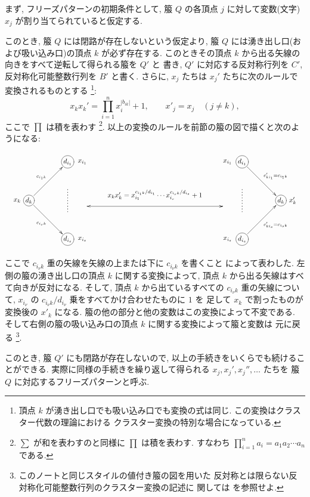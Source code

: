 \documentclass[12pt,twoside,dvipdfm]{jarticle}
\theoremstyle{definition} %
\theoremstyle{definition} %
\theoremstyle{definition} %
\numberwithin{theorem}{section}
\numberwithin{equation}{section}
\numberwithin{figure}{section}
\numberwithin{table}{section}
\begin{document}
まず, フリーズパターンの初期条件として,
箙 $Q$ の各頂点 $j$ に対して変数(文字) $x_j$ が割り当てられていると仮定する.

このとき, 箙 $Q$ には閉路が存在しないという仮定より, 
箙 $Q$ には湧き出し口(および吸い込み口)の頂点 $k$ が必ず存在する.
このときその頂点 $k$ から出る矢線の向きをすべて逆転して得られる箙を $Q'$ と
書き, $Q'$ に対応する反対称行列を $C'$, 反対称化可能整数行列を $B'$ と書く.
さらに, $x_j$ たちは $x_j'$ たちに次のルールで変換されるものとする%
\footnote{頂点 $k$ が湧き出し口でも吸い込み口でも変換の式は同じ.
この変換はクラスター代数の理論における
クラスター変換の特別な場合になっている.}:
\begin{equation*}
x_k x_k' = \prod_{i=1}^n x_i^{|b_{ik}|} + 1, \qquad
x'_j=x_j \quad (j\ne k),
\tag{$*$}
\end{equation*}
ここで $\prod$ は積を表わす%
\footnote{$\sum$ が和を表わすのと同様に $\prod$ は積を表わす.
すなわち $\prod_{i=1}^n a_i = a_1a_2\cdots a_n$ である.}.
以上の変換のルールを前節の箙の図で描くと次のようになる:
\[
\begin{xy}
 (  0,20) *+[Fo]{d_k}     ="k"*++++!R{x_k},
 ( 20,40) *+[Fo]{d_{i_1}} ="1"*+++++!L{x_{i_1}},
 ( 20,21) *+{\vdots},
 ( 20,25.3) *+{\vdots},
 ( 20,16.7) *+{\vdots},
 ( 20, 0) *+[Fo]{d_{i_s}} ="s"*+++++!L{x_{i_s}},
 (130,20) *+[Fo]{d_k}     ="kk"*++++!L{x'_k},
 (110,40) *+[Fo]{d_{i_1}} ="11"*+++++!R{x_{i_1}},
 (110,21) *+{\vdots},
 (110,25.3) *+{\vdots},
 (110,16.7) *+{\vdots},
 (110, 0) *+[Fo]{d_{i_s}} ="ss"*+++++!R{x_{i_s}},
 ( 65,23) *+{x_k x_k' = x_{i_1}^{c_{i_1 k}/d_{i_1}}\cdots x_{i_s}^{c_{i_s k}/d_{i_s}}+1},
 \ar@{<->}(30,17);(100,17),
 \ar@{->}"k";"1"^{c_{i_1 k}}
 \ar@{->}"k";"s"_{c_{i_s k}}
 \ar@{->}"11";"kk"^{c'_{k i_1}=c_{i_1 k}}
 \ar@{->}"ss";"kk"_{c'_{k i_s}=c_{i_s k}}
\end{xy}
\]
ここで $c_{i_\nu k}$ 重の矢線を矢線の上または下に $c_{i_\nu k}$ を書くこと
によって表わした. 左側の箙の湧き出し口の頂点 $k$ に関する変換によって, 
頂点 $k$ から出る矢線はすべて向きが反対になる.
そして, 頂点 $k$ から出ているすべての $c_{i_\nu k}$ 重の矢線について, 
$x_{i_\nu}$ の $c_{i_\nu k}/d_{i_\nu}$ 乗をすべてかけ合わせたものに $1$ を
足して $x_k$ で割ったものが変換後の $x'_k$ になる.
箙の他の部分と他の変数はこの変換によって不変である.
そして右側の箙の吸い込み口の頂点 $k$ に関する変換によって箙と変数は
元に戻る%
\footnote{このノートと同じスタイルの値付き箙の図を用いた
反対称とは限らない反対称化可能整数行列のクラスター変換の記述に
関しては \cite{Kuroki-QG2} を参照せよ.}.

このとき, 箙 $Q'$ にも閉路が存在しないので, 
以上の手続きをいくらでも続けることができる.
実際に同様の手続きを繰り返して得られる $x_j,x_j',x_j'',\ldots$ たちを
箙 $Q$ に対応するフリーズパターンと呼ぶ.
\end{document}
